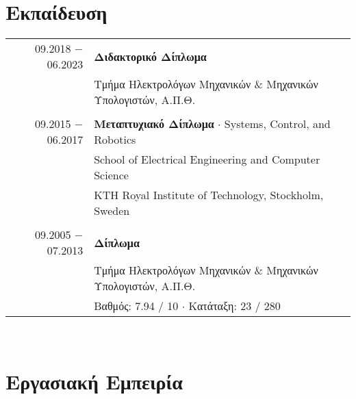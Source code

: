 \documentclass[a4paper,10pt,twoside]{article}
\begin{document}


\par{\bigskip\par}



\section{Εκπαίδευση}

\begin{tabular}{rp{11cm}}
09.2018 $-$ 06.2023 & \textbf{Διδακτορικό Δίπλωμα} \\
                    & Τμήμα Ηλεκτρολόγων Μηχανικών \& Μηχανικών Υπολογιστών, Α.Π.Θ.\\
&\\
09.2015 $-$ 06.2017 & \textbf{Μεταπτυχιακό Δίπλωμα} $\cdot$ Systems, Control, and Robotics\\
                    & School of Electrical Engineering and Computer Science \\
                    & KTH Royal Institute of Technology, Stockholm, Sweden\\
&\\
09.2005 $-$ 07.2013 & \textbf{Δίπλωμα} \\
                    & Τμήμα Ηλεκτρολόγων Μηχανικών \& Μηχανικών Υπολογιστών, Α.Π.Θ.\\
                    & {\small Βαθμός: 7.94 / 10 $\cdot$ Κατάταξη: 23 / 280}
\end{tabular}\\



\section{Εργασιακή Εμπειρία}
\end{document}
